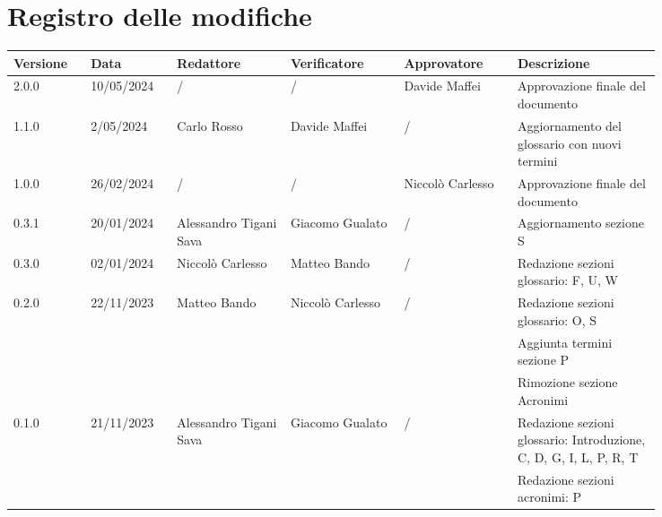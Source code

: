 \section*{Registro delle modifiche}
 {
  \renewcommand{\arraystretch}{1.5}
  \scriptsize
  \begin{longtable}{p{0.10\linewidth}p{0.10\linewidth}p{0.15\linewidth}p{0.15\linewidth}p{0.15\linewidth}p{0.19\linewidth}}
	  \textbf{Versione} & \textbf{Data} & \textbf{Redattore}     & \textbf{Verificatore} & \textbf{Approvatore} & \textbf{Descrizione}                                              \\
	  \toprule
	  2.0.0			 	& 10/05/2024    & / 					&  /        			& Davide Maffei        & Approvazione finale del documento                                 \\
	  \hline
	  1.1.0 		    & 2/05/2024    & Carlo Rosso            & Davide Maffei         & /       				& Aggiornamento del glossario con nuovi termini                                           \\
	  \hline
	  1.0.0             & 26/02/2024    & /                      & /                     & Niccolò Carlesso     & Approvazione finale del documento                                 \\
	  \hline
	  0.3.1             & 20/01/2024    & Alessandro Tigani Sava & Giacomo Gualato       & /                    & Aggiornamento sezione S                                           \\
	  \hline
	  0.3.0             & 02/01/2024    & Niccolò Carlesso       & Matteo Bando          & /                    & Redazione sezioni glossario: F, U, W                              \\
	  \hline
	  0.2.0             & 22/11/2023    & Matteo Bando           & Niccolò Carlesso      & /                    & Redazione sezioni glossario: O, S                                 \\
	                    &               &                        &                       &                      & Aggiunta termini sezione P                                        \\
	                    &               &                        &                       &                      & Rimozione sezione Acronimi                                        \\
	  \hline
	  0.1.0             & 21/11/2023    & Alessandro Tigani Sava & Giacomo Gualato       & /                    & Redazione sezioni glossario: Introduzione, C, D, G, I, L, P, R, T \\
	                    &               &                        &                       &                      & Redazione sezioni acronimi: P                                     \\
	  \bottomrule
  \end{longtable}
 }
